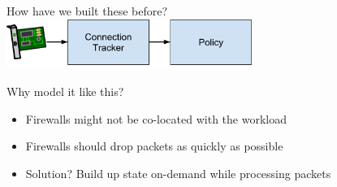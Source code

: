 \documentclass[black,white]{beamer}
\begin{document}

    \begin{frame}[fragile]{How have we built these before?}
        \centering
        \vfill
        \includegraphics[width=0.6\textwidth]{sfw-ct-policy.png}
        \vfill
    \end{frame}

    \begin{frame}{Why model it like this?}
        \begin{itemize}
             \item Firewalls might not be co-located with the workload \bigskip
             \item Firewalls should drop packets as quickly as possible \bigskip
             \item Solution? Build up state on-demand while processing packets \bigskip
        \end{itemize}
    \end{frame}
\end{document}
